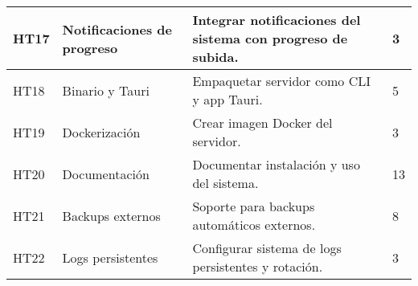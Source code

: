 \begin{tabularx}{\textwidth}{|l|l|>{\raggedright\arraybackslash}X|p{2cm}|}
    \hline
    HT17 & Notificaciones de progreso & Integrar notificaciones del sistema con progreso de subida. & 3 \\
    \hline
    HT18 & Binario y Tauri & Empaquetar servidor como CLI y app Tauri. & 5 \\
    \hline
    HT19 & Dockerización & Crear imagen Docker del servidor. & 3 \\
    \hline
    HT20 & Documentación & Documentar instalación y uso del sistema. & 13 \\
    \hline
    HT21 & Backups externos & Soporte para backups automáticos externos. & 8 \\
    \hline
    HT22 & Logs persistentes & Configurar sistema de logs persistentes y rotación. & 3 \\
    \hline
\end{tabularx}

